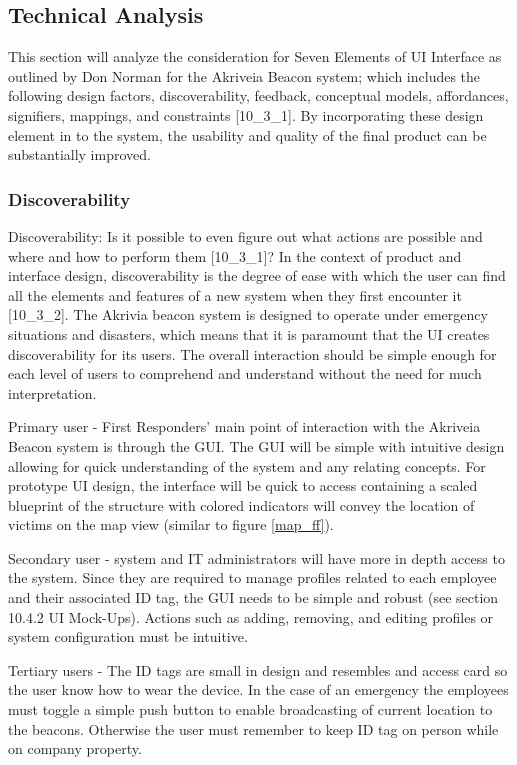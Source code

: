 

\subsection{Technical Analysis}
\bigskip
This section will analyze the consideration for Seven Elements of UI Interface as outlined by Don Norman for the Akriveia Beacon system; which includes the following design factors, discoverability, feedback, conceptual models, affordances, signifiers, mappings, and constraints [10\_3\_1]. By incorporating these design element in to the system, the usability and quality of the final product can be substantially improved. 
\medskip

\subsubsection{Discoverability}
\medskip
Discoverability: Is it possible to even figure out what actions are possible and where and how to perform them [10\_3\_1]?  In the context of product and interface design, discoverability is the degree of ease with which the user can find all the elements and features of a new system when they first encounter it [10\_3\_2]. The Akrivia beacon system is designed to operate under emergency situations and disasters, which means that it is paramount that the UI creates discoverability for its users. The overall interaction should be simple enough for each level of users to comprehend and understand without the need for much interpretation. 

\bigskip
Primary user - First Responders’ main point of interaction with the Akriveia Beacon system is through the GUI. The GUI will be simple with intuitive design allowing for quick understanding of the system and any relating concepts. For prototype UI design, the interface will be quick to access containing a scaled blueprint of the structure with colored indicators will convey the location of victims on the map view (similar to figure \ref{map_ff}). 

\bigskip
Secondary user - system and IT administrators will have more in depth access to the system. Since they are required to manage profiles related to each employee and their associated ID tag, the GUI needs to be simple and robust (see section 10.4.2 UI Mock-Ups). Actions such as adding, removing, and editing profiles or system configuration must be intuitive. 

\bigskip
Tertiary users - The ID tags are small in design and resembles and access card so the user know how to wear the device. In the case of an emergency the employees must toggle a simple push button to enable broadcasting of current location to the beacons. Otherwise the user must remember to keep ID tag on person while on company property.
\medskip


